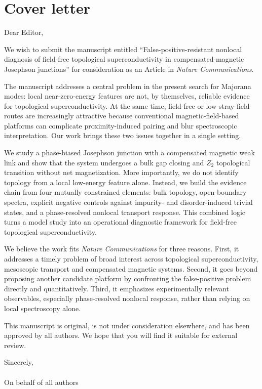\section*{Cover letter}

Dear Editor,

We wish to submit the manuscript entitled ``False-positive-resistant nonlocal diagnosis of field-free topological superconductivity in compensated-magnetic Josephson junctions'' for consideration as an Article in \textit{Nature Communications}.

The manuscript addresses a central problem in the present search for Majorana modes: local near-zero-energy features are not, by themselves, reliable evidence for topological superconductivity. At the same time, field-free or low-stray-field routes are increasingly attractive because conventional magnetic-field-based platforms can complicate proximity-induced pairing and blur spectroscopic interpretation. Our work brings these two issues together in a single setting.

We study a phase-biased Josephson junction with a compensated magnetic weak link and show that the system undergoes a bulk gap closing and $Z_2$ topological transition without net magnetization. More importantly, we do not identify topology from a local low-energy feature alone. Instead, we build the evidence chain from four mutually constrained elements: bulk topology, open-boundary spectra, explicit negative controls against impurity- and disorder-induced trivial states, and a phase-resolved nonlocal transport response. This combined logic turns a model study into an operational diagnostic framework for field-free topological superconductivity.

We believe the work fits \textit{Nature Communications} for three reasons. First, it addresses a timely problem of broad interest across topological superconductivity, mesoscopic transport and compensated magnetic systems. Second, it goes beyond proposing another candidate platform by confronting the false-positive problem directly and quantitatively. Third, it emphasizes experimentally relevant observables, especially phase-resolved nonlocal response, rather than relying on local spectroscopy alone.

This manuscript is original, is not under consideration elsewhere, and has been approved by all authors. We hope that you will find it suitable for external review.

Sincerely,\\
[Corresponding author name]\\
On behalf of all authors


